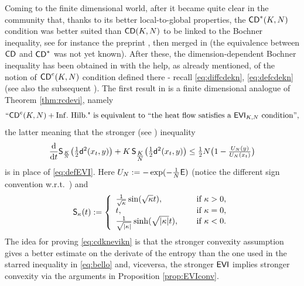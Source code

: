 \documentclass[11pt]{article}
\numberwithin{equation}{section}
\newcommand{\sfd}{{\sf d}}
\newcommand{\CD}{{\sf CD}}
\renewcommand{\d}{{\rm d}}
\newcommand{\E}{{\sf E}} %
\newcommand{\EVI}{{\sf EVI}}
\begin{document}
{{\medskip

Coming to the finite dimensional world, after \cite{BacherSturm10} it became quite clear in the community that, thanks to its better local-to-global properties,  the $\CD^*(K,N)$ condition was better suited than $\CD(K,N)$ to be linked to the Bochner inequality, see for instance  the preprint \cite{Bochner-CD}, then merged in \cite{Gigli13} (the equivalence between $\CD$ and $\CD^*$ was not yet known). After these, the dimension-dependent Bochner inequality has been obtained in \cite{Erbar-Kuwada-Sturm13} with the help, as already mentioned, of the notion of $\CD^e(K,N)$ condition defined there - recall \eqref{eq:diffcdekn}, \eqref{eq:defcdekn} (see also the subsequent \cite{AmbrosioMondinoSavare13}). The first result  in \cite{Erbar-Kuwada-Sturm13} is a finite dimensional analogue of Theorem \ref{thm:rcdevi}, namely
\begin{equation}
\label{eq:cdknevikn}
\text{``$\CD^e(K,N)+{\rm Inf.\ Hilb.}$" is equivalent to ``the heat flow satisfies a $\EVI_{K,N}$ condition'',}
\end{equation}
the latter meaning that the stronger (see \cite[Lemma 2.15]{Erbar-Kuwada-Sturm13}) inequality
\begin{equation}
\label{eq:evikn}
\frac{\d}{\d t}{\sf S}_{\frac  KN}\big(\tfrac12\sfd^2(x_t,y)\big)+K\,{\sf S}_{\tfrac KN}\big(\tfrac12\sfd^2(x_t,y)\big)\leq \tfrac 12N\big(1-\tfrac{U_N(y)}{U_N(x_t)}\big)
\end{equation}
is in place of \eqref{eq:defEVI}. Here $U_N:=-\exp(-\tfrac 1N\E)$ (notice the different sign convention w.r.t.\ \cite{Erbar-Kuwada-Sturm13}) and 
\[
{\sf S}_\kappa(t):=\left\{
\begin{array}{ll}
\tfrac{1}{\sqrt \kappa}\sin(\sqrt\kappa t),&\quad\text{ if }\kappa>0,\\
t,&\quad\text{ if }\kappa=0,\\
\tfrac{1}{\sqrt {|\kappa|}}\sinh(\sqrt{|\kappa|} t),&\quad\text{ if }\kappa<0.\\
\end{array}
\right.
\]
The idea for proving \eqref{eq:cdknevikn} is that the stronger convexity assumption gives a better estimate on the derivate of the entropy than the one used in the starred inequality in \eqref{eq:bello} and, viceversa, the stronger $\EVI$ implies stronger convexity via the arguments in Proposition \ref{prop:EVIconv}.

}}
\end{document}
